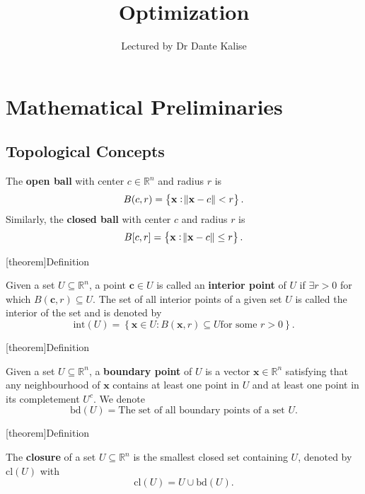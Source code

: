 \documentclass[12pt]{report}
\author{Lectured by Dr Dante Kalise}
\title{Optimization}
\affil{Typed by Aris Zhu Yi Qing}
\theoremstyle{definition}
\begin{document}
\maketitle
\tableofcontents

\chapter{Mathematical Preliminaries}

\section{Topological Concepts}

\begin{theorem}
    The \textbf{open ball} with center $c\in\mathbb{R}^{n}$ and radius $r$ is
    \[
        B(c,r)=\left\{\mathbf{x}:\norm{\mathbf{x}-c}<r\right\}.
    \]
    Similarly, the \textbf{closed ball} with center $c$ and radius $r$ is
    \[
        B[c,r]=\left\{\mathbf{x}:\norm{\mathbf{x}-c}\le r\right\}.
    \]
\end{theorem}

[theorem]{Definition}
\begin{interior point}
    Given a set $U\subseteq\mathbb{R}^{n}$, a point $\mathbf{c}\in U$ is called an
    \textbf{interior point} of $U$ if $\exists r>0$ for which
    $B(\mathbf{c},r)\subseteq U$. The set of all interior points of a given set
    $U$ is called the interior of the set and is denoted by
    \[
        \text{int}(U)=\left\{\mathbf{x}\in U:B(\mathbf{x},r)\subseteq U\text{
        for some }r>0\right\}.
    \]
\end{interior point}

[theorem]{Definition}
\begin{boundary points}
    Given a set $U\subseteq\mathbb{R}^{n}$, a \textbf{boundary point} of $U$ is
    a vector $\mathbf{x}\in\mathbb{R}^{n}$ satisfying that any neighbourhood of $\mathbf{x}$
    contains at least one point in $U$ and at least one point in its
    completement $U^{c}$. 
    We denote
    \[
        \text{bd}(U) = \text{The set of all boundary points of a set $U$}.
    \]
\end{boundary points}

[theorem]{Definition}
\begin{closure}
    The \textbf{closure} of a set $U\subseteq\mathbb{R}^{n}$ is 
    the smallest closed set containing $U$,
    denoted by cl$(U)$ with
    \[
        \text{cl}(U)=U\cup\text{bd}(U).
    \]
\end{closure}
\end{document}
